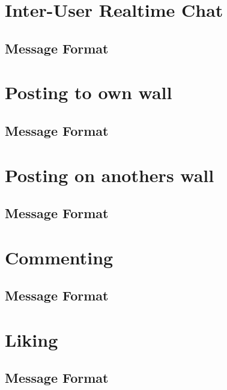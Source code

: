 \section{Inter-User Realtime Chat}
\subsection{Message Format}

\section{Posting to own wall}
\subsection{Message Format}

\section{Posting on anothers wall}
\subsection{Message Format}

\section{Commenting}
\subsection{Message Format}

\section{Liking}
\subsection{Message Format}
